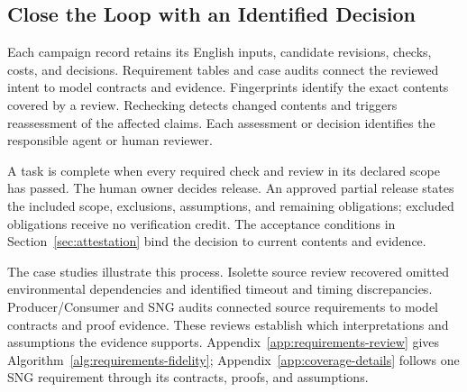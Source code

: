 \subsection{Close the Loop with an Identified Decision}
Each campaign record retains its English inputs, candidate revisions, checks, costs, and decisions. Requirement tables and case audits connect the reviewed intent to model contracts and evidence. Fingerprints identify the exact contents covered by a review. Rechecking detects changed contents and triggers reassessment of the affected claims. Each assessment or decision identifies the responsible agent or human reviewer.

A task is complete when every required check and review in its declared scope has passed. The human owner decides release. An approved partial release states the included scope, exclusions, assumptions, and remaining obligations; excluded obligations receive no verification credit. The acceptance conditions in Section~\ref{sec:attestation} bind the decision to current contents and evidence.

The case studies illustrate this process. Isolette source review recovered omitted environmental dependencies and identified timeout and timing discrepancies. Producer/Consumer and SNG audits connected source requirements to model contracts and proof evidence. These reviews establish which interpretations and assumptions the evidence supports. Appendix~\ref{app:requirements-review} gives Algorithm~\ref{alg:requirements-fidelity}; Appendix~\ref{app:coverage-details} follows one SNG requirement through its contracts, proofs, and assumptions.

